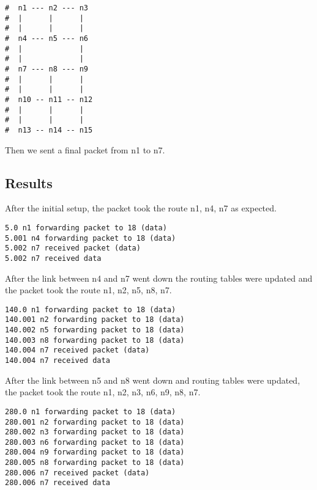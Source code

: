 \documentclass[11pt]{article}
\begin{document}
\vspace{5mm}

\begin{lstlisting}
#  n1 --- n2 --- n3
#  |      |      |
#  |      |      |
#  n4 --- n5 --- n6
#  |             |
#  |             |
#  n7 --- n8 --- n9
#  |      |      |
#  |      |      |
#  n10 -- n11 -- n12
#  |      |      |
#  |      |      |
#  n13 -- n14 -- n15
\end{lstlisting}

\vspace{5mm}

Then we sent a final packet from n1 to n7.

\subsection{Results}

After the initial setup, the packet took the route n1, n4, n7 as expected.

\vspace{5mm}

\begin{lstlisting}
5.0 n1 forwarding packet to 18 (data)
5.001 n4 forwarding packet to 18 (data)
5.002 n7 received packet (data)
5.002 n7 received data
\end{lstlisting}

\vspace{5mm}

After the link between n4 and n7 went down the routing tables were updated and the packet took the route n1, n2, n5, n8, n7.

\vspace{5mm}

\begin{lstlisting}
140.0 n1 forwarding packet to 18 (data)
140.001 n2 forwarding packet to 18 (data)
140.002 n5 forwarding packet to 18 (data)
140.003 n8 forwarding packet to 18 (data)
140.004 n7 received packet (data)
140.004 n7 received data
\end{lstlisting}

\vspace{5mm}

After the link between n5 and n8 went down and routing tables were updated, the packet took the route n1, n2, n3, n6, n9, n8, n7.

\vspace{5mm}

\begin{lstlisting}
280.0 n1 forwarding packet to 18 (data)
280.001 n2 forwarding packet to 18 (data)
280.002 n3 forwarding packet to 18 (data)
280.003 n6 forwarding packet to 18 (data)
280.004 n9 forwarding packet to 18 (data)
280.005 n8 forwarding packet to 18 (data)
280.006 n7 received packet (data)
280.006 n7 received data
\end{lstlisting}
\end{document}
